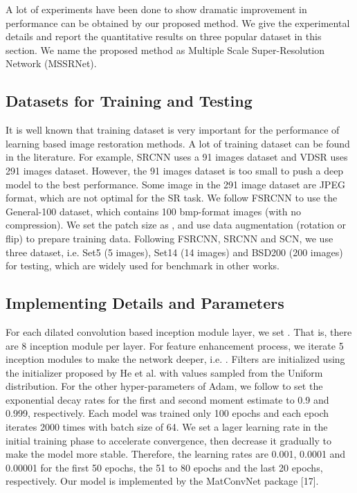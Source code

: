 \documentclass{article}
\begin{document}
A lot of experiments have been done to show dramatic improvement in performance can be obtained by our proposed method. We give the experimental details and report the quantitative results on three popular dataset in this section. We name the proposed method as Multiple Scale Super-Resolution Network (MSSRNet).

\subsection{Datasets for Training and Testing}
\label{subsec:datasets}

It is well known that training dataset is very important for the performance of learning based image restoration methods. A lot of training dataset can be found in the literature. For example, SRCNN \cite{ref4,ref5} uses a 91 images dataset and VDSR \cite{ref9} uses 291 images dataset. However, the 91 images dataset is too small to push a deep model to the best performance. Some image in the 291 image dataset are JPEG format, which are not optimal for the SR task. We follow FSRCNN \cite{ref7} to use the General-100 dataset, which contains 100 bmp-format images (with no compression). We set the patch size as , and use data augmentation (rotation or flip) to prepare training data. Following FSRCNN, SRCNN and SCN, we use three dataset, i.e. Set5 \cite{ref18} (5 images), Set14 \cite{ref19} (14 images) and BSD200 \cite{ref20} (200 images) for testing, which are widely used for benchmark in other works.

\subsection{Implementing Details and Parameters}
\label{subsec:implementing}

For each dilated convolution based inception module layer, we set . That is, there are 8 inception module per layer. For feature enhancement process, we iterate 5 inception modules to make the network deeper, i.e. . Filters are initialized using the initializer proposed by He et al. \cite{ref21} with values sampled from the Uniform distribution. For the other hyper-parameters of Adam, we follow \cite{refadd1} to set the exponential decay rates for the first and second moment estimate to 0.9 and 0.999, respectively. Each model was trained only 100 epochs and each epoch iterates 2000 times with batch size of 64. We set a lager learning rate in the initial training phase to accelerate convergence, then decrease it gradually to make the model more stable. Therefore, the learning rates are 0.001, 0.0001 and 0.00001 for the first 50 epochs, the 51 to 80 epochs and the last 20 epochs, respectively. Our model is implemented by the MatConvNet package [17].
\end{document}
